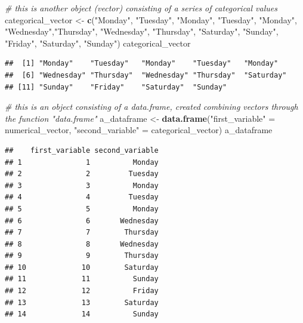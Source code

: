 \documentclass[
]{article}
\newenvironment{Shaded}{\begin{snugshade}}{\end{snugshade}}
\newcommand{\CommentTok}[1]{\textcolor[rgb]{0.56,0.35,0.01}{\textit{#1}}}
\newcommand{\KeywordTok}[1]{\textcolor[rgb]{0.13,0.29,0.53}{\textbf{#1}}}
\newcommand{\NormalTok}[1]{#1}
\newcommand{\StringTok}[1]{\textcolor[rgb]{0.31,0.60,0.02}{#1}}
\begin{document}
\begin{Shaded}
\begin{Highlighting}[]
\CommentTok{# this is another object (vector) consisting of a series of categorical values}
\NormalTok{categorical_vector <-}\StringTok{ }\KeywordTok{c}\NormalTok{(}\StringTok{"Monday"}\NormalTok{, }\StringTok{"Tuesday"}\NormalTok{, }\StringTok{"Monday"}\NormalTok{, }\StringTok{"Tuesday"}\NormalTok{, }\StringTok{"Monday"}\NormalTok{, }\StringTok{"Wednesday"}\NormalTok{,}\StringTok{"Thursday"}\NormalTok{, }\StringTok{"Wednesday"}\NormalTok{, }\StringTok{"Thursday"}\NormalTok{, }\StringTok{"Saturday"}\NormalTok{, }\StringTok{"Sunday"}\NormalTok{, }\StringTok{"Friday"}\NormalTok{, }\StringTok{"Saturday"}\NormalTok{, }\StringTok{"Sunday"}\NormalTok{)}
\NormalTok{categorical_vector}
\end{Highlighting}
\end{Shaded}

\begin{verbatim}
##  [1] "Monday"    "Tuesday"   "Monday"    "Tuesday"   "Monday"   
##  [6] "Wednesday" "Thursday"  "Wednesday" "Thursday"  "Saturday" 
## [11] "Sunday"    "Friday"    "Saturday"  "Sunday"
\end{verbatim}

\begin{Shaded}
\begin{Highlighting}[]
\CommentTok{# this is an object consisting of a data.frame, created combining vectors through the function "data.frame"}
\NormalTok{a_dataframe <-}\StringTok{ }\KeywordTok{data.frame}\NormalTok{(}\StringTok{"first_variable"}\NormalTok{ =}\StringTok{ }\NormalTok{numerical_vector,}
                          \StringTok{"second_variable"}\NormalTok{ =}\StringTok{ }\NormalTok{categorical_vector)}
\NormalTok{a_dataframe}
\end{Highlighting}
\end{Shaded}

\begin{verbatim}
##    first_variable second_variable
## 1               1          Monday
## 2               2         Tuesday
## 3               3          Monday
## 4               4         Tuesday
## 5               5          Monday
## 6               6       Wednesday
## 7               7        Thursday
## 8               8       Wednesday
## 9               9        Thursday
## 10             10        Saturday
## 11             11          Sunday
## 12             12          Friday
## 13             13        Saturday
## 14             14          Sunday
\end{verbatim}
\end{document}

